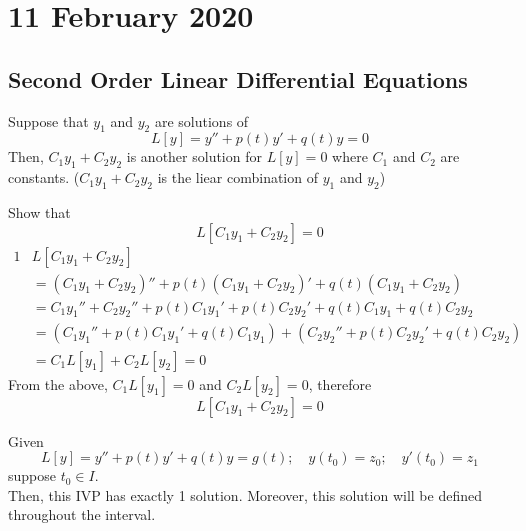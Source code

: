 \documentclass[twoside]{report}
\begin{document}
    \chapter{11 February 2020}
    \section{Second Order Linear Differential Equations}
    \begin{btheorem}
        Suppose that $y_{1}$ and $y_{2}$ are solutions of
        \begin{equation}
            L[y]= y'' + p(t)y' + q(t)y= 0
        \end{equation}
        Then, $C_{1}y_{1} + C_{2}y_{2}$ is another solution for $L[y] = 0$ where $C_{1}$ and $C_{2}$ are constants.
        ($C_{1}y_{1} + C_{2}y_{2}$ is the liear combination of $y_{1}$ and $y_{2}$)
    \end{btheorem}
    \begin{bproof}
        Show that
        \begin{equation}
            L[C_{1}y_{1} + C_{2}y_{2}] = 0
        \end{equation}
        \begin{alignat}{1}
            &L[C_{1}y_{1} + C_{2}y_{2}]\\
            &= (C_{1}y_{1} + C_{2}y_{2})'' + p(t)(C_{1}y_{1} + C_{2}y_{2})' + q(t)(C_{1}y_{1} + C_{2}y_{2})\\
            &=C_{1}y_{1}'' + C_{2}y_{2}'' + p(t)C_{1}y_{1}' + p(t)C_{2}y_{2}' + q(t)C_{1}y_{1} + q(t)C_{2}y_{2}\\
            &= (C_{1}y_{1}'' + p(t)C_{1}y_{1}' + q(t)C_{1}y_{1}) + (C_{2}y_{2}'' + p(t)C_{2}y_{2}' + q(t)C_{2}y_{2})\\
            &= C_{1}L[y_{1}] + C_{2}L[y_{2}] = 0
        \end{alignat}
        From the above, $C_{1}L[y_{1}] = 0$ and $C_{2}L[y_{2}] = 0$, therefore
        \begin{equation}
            L[C_{1}y_{1} + C_{2}y_{2}] = 0
        \end{equation}
    \end{bproof}
    \np
    \begin{btheorem}
        Given
        \begin{equation}
            L[y] = y'' + p(t)y' + q(t)y = g(t);\quad y(t_{0}) = z_{0};\quad y'(t_{0}) = z_{1}
        \end{equation}
        suppose $t_{0}\in I$.\\Then, this IVP has exactly 1 solution. Moreover, this solution will be defined throughout the interval.
    \end{btheorem}
\end{document}
